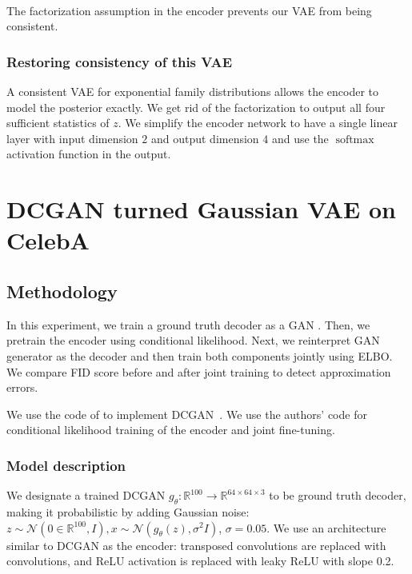 \paragraph{} The factorization assumption in the encoder prevents our VAE from being consistent.

\subsubsection{Restoring consistency of this VAE}

A consistent VAE \cite{shekhovtsov2022vae} for exponential family distributions allows the encoder to model the posterior exactly. We get rid of the factorization to output all four sufficient statistics of $z$. We simplify the encoder network to have a single linear layer with input dimension $2$ and output dimension $4$ and use the $\operatorname{softmax}$ activation function in the output.

\section{DCGAN turned Gaussian VAE on CelebA}\label{sec:celeba}

\subsection{Methodology}
In this experiment, we train a ground truth decoder as a GAN \cite{gan}. Then, we pretrain the encoder using conditional likelihood. Next, we reinterpret GAN generator as the decoder and then train both components jointly using ELBO. We compare FID score \cite{ganfid} before and after joint training to detect approximation errors.

We use the code of \cite{Inkawhich} to implement DCGAN~\cite{dcgan}. We use the authors' code for conditional likelihood training of the encoder and joint fine-tuning.

\subsubsection{Model description}
We designate a trained DCGAN $g_\theta: \mathbb{R}^{100} \to \mathbb{R}^{64\times{}64\times{}3}$ to be ground truth decoder, making it probabilistic by adding Gaussian noise: $z \sim \mathcal{N}(0 \in \mathbb{R}^{100}, I), x \sim \mathcal{N}(g_\theta(z), \sigma^2I)$, $\sigma = 0.05$. We use an architecture similar to DCGAN as the encoder: transposed convolutions are replaced with convolutions, and ReLU activation is replaced with leaky ReLU with slope 0.2.

